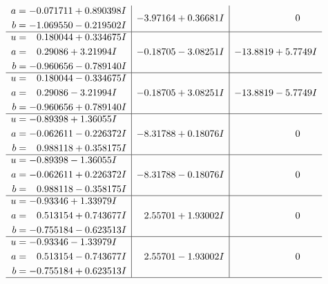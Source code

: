 \documentclass[1p]{elsarticle_modified}
\theoremstyle{definition}
\begin{document}
$$\begin{array}{c|c|c}
\begin{aligned}
a &= -0.071711 + 0.890398 I \\
b &= -1.069550 - 0.219502 I\end{aligned}
 & -3.97164 + 0.36681 I & \phantom{-0.000000 } 0 \\ \hline\begin{aligned}
u &= \phantom{-}0.180044 + 0.334675 I \\
a &= \phantom{-}0.29086 + 3.21994 I \\
b &= -0.960656 - 0.789140 I\end{aligned}
 & -0.18705 - 3.08251 I & -13.8819 + 5.7749 I \\ \hline\begin{aligned}
u &= \phantom{-}0.180044 - 0.334675 I \\
a &= \phantom{-}0.29086 - 3.21994 I \\
b &= -0.960656 + 0.789140 I\end{aligned}
 & -0.18705 + 3.08251 I & -13.8819 - 5.7749 I \\ \hline\begin{aligned}
u &= -0.89398 + 1.36055 I \\
a &= -0.062611 - 0.226372 I \\
b &= \phantom{-}0.988118 + 0.358175 I\end{aligned}
 & -8.31788 + 0.18076 I & \phantom{-0.000000 } 0 \\ \hline\begin{aligned}
u &= -0.89398 - 1.36055 I \\
a &= -0.062611 + 0.226372 I \\
b &= \phantom{-}0.988118 - 0.358175 I\end{aligned}
 & -8.31788 - 0.18076 I & \phantom{-0.000000 } 0 \\ \hline\begin{aligned}
u &= -0.93346 + 1.33979 I \\
a &= \phantom{-}0.513154 + 0.743677 I \\
b &= -0.755184 - 0.623513 I\end{aligned}
 & \phantom{-}2.55701 + 1.93002 I & \phantom{-0.000000 } 0 \\ \hline\begin{aligned}
u &= -0.93346 - 1.33979 I \\
a &= \phantom{-}0.513154 - 0.743677 I \\
b &= -0.755184 + 0.623513 I\end{aligned}
 & \phantom{-}2.55701 - 1.93002 I & \phantom{-0.000000 } 0\\
 \hline 
 \end{array}$$\newpage$$\begin{array}{c|c|c}  

\end{array}$$
\end{document}
